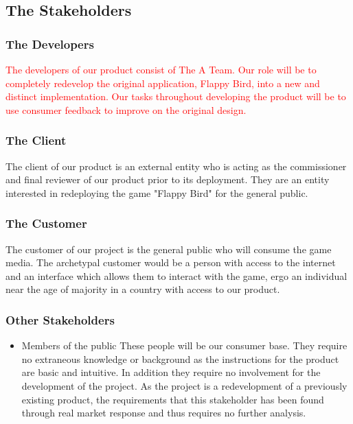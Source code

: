\documentclass[11pt, oneside]{article}   	%
\begin{document}
\subsection{The Stakeholders}
\subsubsection{The Developers}
\textcolor{red}{ The developers of our product consist of The A Team. Our role will be to completely redevelop the original application, Flappy Bird, into a new and distinct implementation. Our tasks throughout developing the product will be to use consumer feedback to improve on the original design.  }

\subsubsection{The Client}
The client of our product is an external entity who is acting as the commissioner and final reviewer of our product prior to its deployment. They are an entity interested in redeploying the game "Flappy Bird" for the general public.


\subsubsection{The Customer}
The customer of our project is the general public who will consume the game media. The archetypal customer would be a person with access to the internet and an interface which allows them to interact with the game, ergo an individual near the age of majority in a country with access to our product.


\subsubsection{Other Stakeholders}
\begin{itemize}
\item Members of the public
\subitem These people will be our consumer base. They require no extraneous knowledge or background as the instructions for the product are basic and intuitive. In addition they require no involvement for the development of the project. As the project is a redevelopment of a previously existing product, the requirements that this stakeholder has been found through real market response and thus requires no further analysis.

\end{itemize}
\end{document}
